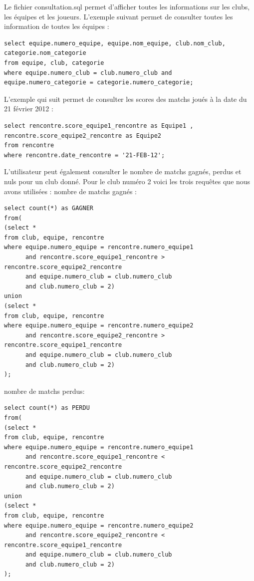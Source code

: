 \documentclass{article}
\begin{document}
Le fichier consultation.sql permet d'afficher toutes les informations sur les clubs, les équipes et les joueurs. 
L'exemple suivant permet de consulter toutes les information de toutes les équipes : \\

\begin{verbatim}
select equipe.numero_equipe, equipe.nom_equipe, club.nom_club, categorie.nom_categorie
from equipe, club, categorie
where equipe.numero_club = club.numero_club and equipe.numero_categorie = categorie.numero_categorie;
\end{verbatim}

L'exemple qui suit permet de consulter les scores des matchs joués à la date du 21 février 2012 : \\

\begin{verbatim}
select rencontre.score_equipe1_rencontre as Equipe1 , rencontre.score_equipe2_rencontre as Equipe2
from rencontre
where rencontre.date_rencontre = '21-FEB-12'; 
\end{verbatim}

L'utilisateur peut également consulter le nombre de matchs gagnés, perdus et nuls pour un club donné.
Pour le club numéro 2 voici les trois requêtes que nous avons utilisées :
nombre de matchs gagnés : \\

\begin{verbatim}
select count(*) as GAGNER
from(
(select *
from club, equipe, rencontre
where equipe.numero_equipe = rencontre.numero_equipe1 
      and rencontre.score_equipe1_rencontre > rencontre.score_equipe2_rencontre
      and equipe.numero_club = club.numero_club
      and club.numero_club = 2)
union
(select *
from club, equipe, rencontre 
where equipe.numero_equipe = rencontre.numero_equipe2
      and rencontre.score_equipe2_rencontre > rencontre.score_equipe1_rencontre
      and equipe.numero_club = club.numero_club
      and club.numero_club = 2)
);
\end{verbatim}

nombre de matchs perdus: \\

\begin{verbatim}
select count(*) as PERDU
from(
(select *
from club, equipe, rencontre
where equipe.numero_equipe = rencontre.numero_equipe1 
      and rencontre.score_equipe1_rencontre < rencontre.score_equipe2_rencontre
      and equipe.numero_club = club.numero_club
      and club.numero_club = 2)
union
(select *
from club, equipe, rencontre 
where equipe.numero_equipe = rencontre.numero_equipe2
      and rencontre.score_equipe2_rencontre < rencontre.score_equipe1_rencontre
      and equipe.numero_club = club.numero_club
      and club.numero_club = 2)
);
\end{verbatim}
\end{document}
